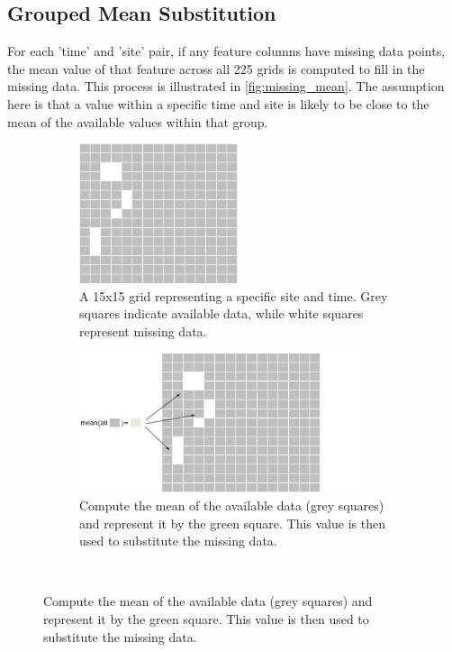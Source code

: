\documentclass[a4paper,11pt]{report}
\begin{document}
\subsection{Grouped Mean Substitution}

For each 'time' and 'site' pair, if any feature columns have missing data points, the mean value of that feature across all 225 grids is computed to fill in the missing data. This process is illustrated in \ref{fig:missing_mean}. The assumption here is that a value within a specific time and site is likely to be close to the mean of the available values within that group.

\captionsetup[subfigure]{justification=raggedright}
\begin{figure}[H]
     \centering
     \begin{subfigure}[t]{0.4\textwidth}
         \centering
         \includegraphics[height=4.1cm]{images/step1.jpg}
         \caption{A 15x15 grid representing a specific site and time. Grey squares indicate available data, while white squares represent missing data.}
         \label{fig:step1}
     \end{subfigure}
     \begin{subfigure}[t]{0.4\textwidth}
         \centering
         \includegraphics[height=4.1cm]{images/step2.jpg}
         \caption{Compute the mean of the available data (grey squares) and represent it by the green square. This value is then used to substitute the missing data.}
         \label{fig:step2}
     \end{subfigure}
     \hfill
     \vspace{0.5cm}\\

\end{figure}
\end{document}
